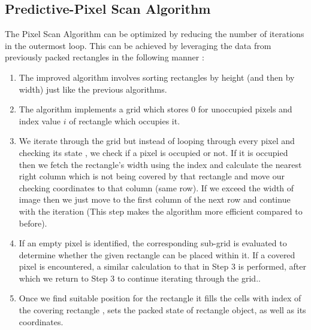 \documentclass[12pt, a4paper,openany]{article}
\begin{document}
\subsection{Predictive-Pixel Scan Algorithm}
\begin{flushleft}
The Pixel Scan Algorithm can be optimized by reducing the number of iterations in the outermost loop. This can be achieved by leveraging the data from previously packed rectangles in the following manner :
\begin{enumerate}
    \item The improved algorithm involves sorting rectangles by height (and then by width) just like the previous algorithms.
    \item The algorithm implements a grid which stores 0 for unoccupied pixels and index value \(i\) of rectangle which occupies it.
    \item We iterate through the grid but instead of  looping through every pixel and checking its state , we check if a pixel is occupied or not. If it is occupied then we fetch the rectangle's width using the index and calculate the nearest right column which is not being covered by that rectangle and move our checking coordinates to that column (same row). If we exceed the width of image then we just move to the first column of the next row and continue with the iteration (This step makes the algorithm more efficient compared to before).
    \item If an empty pixel is identified, the corresponding sub-grid is evaluated to determine whether the given rectangle can be placed within it. If a covered pixel is encountered, a similar calculation to that in Step 3 is performed, after which we return to Step 3 to continue iterating through the grid..
    \item Once we find suitable position for the rectangle it fills the cells with index of the covering rectangle , sets the packed state of rectangle object, as well as its coordinates. 
\end{enumerate}

\end{flushleft}

\begin{center}
    

\end{center}
\end{document}
